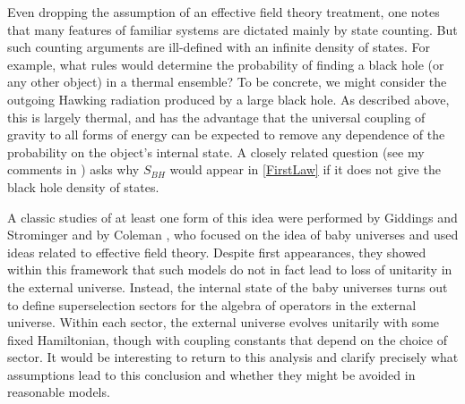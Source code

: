 \documentclass[10pt]{article}
\begin{document}
Even dropping the assumption of an effective field theory treatment, one notes that many features of familiar systems are dictated mainly by state counting.  But such counting arguments are ill-defined with an infinite density of states. For example, what rules would determine the probability of finding a black hole (or any other object) in a thermal ensemble?  To be concrete, we might consider the outgoing Hawking radiation produced by a large black hole.  As described above, this is largely thermal, and has the advantage that the universal coupling of gravity to all forms of energy can be expected to remove any dependence of the probability on the object's internal state.  A closely related question (see my comments in \cite{Jacobson:2005kr}) asks why $S_{BH}$ would appear in \eqref{FirstLaw} if it does not give the black hole density of states.

A classic studies of at least one form of this idea were performed by Giddings and Strominger \cite{Giddings:1988cx} and by Coleman \cite{Coleman:1988cy}, who focused on the idea of baby universes and used ideas related to effective field theory.  Despite first appearances, they showed  within this framework that such models do not in fact lead to loss of unitarity in the external universe.  Instead, the internal state of the baby universes turns out to define superselection sectors for the algebra of operators in the external universe.  Within each sector,  the external universe evolves unitarily with some fixed Hamiltonian, though with coupling constants that depend on the choice of sector.  It would be interesting to return to this analysis and clarify precisely what assumptions lead to this conclusion and whether they might be avoided in reasonable models.
\end{document}
